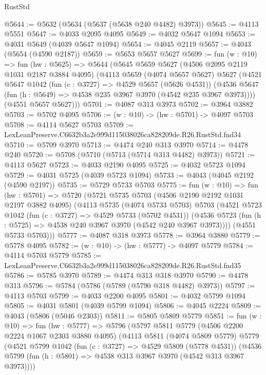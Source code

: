 \begin{lexlean}{RustStd}
\begin{coremodule}
@5644 := @5632 (@5634 (@5637 (@5638 @240 @4482) @3973))
@5645 := @4113 @5551
@5647 := @4033 @2095 @4095
@5649 := @4032 @5647 @1094
@5653 := @4031 @5649 (@4039 @5647 @1094)
@5654 := @4045 @2119
@5657 := @4043 (@5654 (@4590 @2187))
@5659 := @5653 @5657 @5627
@5699 := fun (w : @10) =>
  fun (hw : @5625) =>
  @5644
    (@5645
      @5659
      @5627
      (@4506 @2095 @2119 @1031 @2187 @3884 @4095)
      (@4113
        @5659
        (@4074 @5657 @5627)
        @5627
        (@4521
          @5647
          @1042
          (fun (c : @3727) => @4529 @5657 (@5626 @4531))
          (@4536 @5647 (fun (h : @5649) => @4538 @235 @3967 @3970 (@4542 @235 @3967 @3973))))
        (@4551 @5657 @5627)))
@5701 := @4087 @313 @3973
@5702 := @3964 @3882
@5703 := @5702 @4095
@5706 := (w : @10) -> (hw : @5701) -> @4097 @5703
@5708 := @4114 @5627 @5703
@5709 := LexLeanPreserve.C6632b3a2e999d115038026ca828209de.R26.RustStd.fnd34
@5710 := @5709 @3970
@5713 := @4474 @240 @313 @3970
@5714 := @4478 @240
@5720 := @5708 (@5710 (@5713 (@5714 @313 @4482) @3973))
@5721 := @4113 @5627
@5723 := @4033 @2190 @4095
@5725 := @4032 @5723 @1094
@5729 := @4031 @5725 (@4039 @5723 @1094)
@5733 := @4043 (@4045 @2192 (@4590 @2197))
@5735 := @5729 @5733 @5703
@5775 := fun (w : @10) =>
  fun (hw : @5701) =>
  @5720
    (@5721
      @5735
      @5703
      (@4506 @2190 @2192 @1031 @2197 @3882 @4095)
      (@4113
        @5735
        (@4074 @5733 @5703)
        @5703
        (@4521
          @5723
          @1042
          (fun (c : @3727) => @4529 @5733 (@5702 @4531))
          (@4536 @5723 (fun (h : @5725) => @4538 @240 @3967 @3970 (@4542 @240 @3967 @3973))))
        (@4551 @5733 @5703)))
@5777 := @4087 @318 @3973
@5778 := @3964 @3880
@5779 := @5778 @4095
@5782 := (w : @10) -> (hw : @5777) -> @4097 @5779
@5784 := @4114 @5703 @5779
@5785 := LexLeanPreserve.C6632b3a2e999d115038026ca828209de.R26.RustStd.fnd35
@5786 := @5785 @3970
@5789 := @4474 @313 @318 @3970
@5790 := @4478 @313
@5796 := @5784 (@5786 (@5789 (@5790 @318 @4482) @3973))
@5797 := @4113 @5703
@5799 := @4033 @2200 @4095
@5801 := @4032 @5799 @1094
@5805 := @4031 @5801 (@4039 @5799 @1094)
@5806 := @4045 @2224
@5809 := @4043 (@5806 (@5046 @2303))
@5811 := @5805 @5809 @5779
@5851 := fun (w : @10) =>
  fun (hw : @5777) =>
  @5796
    (@5797
      @5811
      @5779
      (@4506 @2200 @2224 @1067 @2303 @3880 @4095)
      (@4113
        @5811
        (@4074 @5809 @5779)
        @5779
        (@4521
          @5799
          @1042
          (fun (c : @3727) => @4529 @5809 (@5778 @4531))
          (@4536 @5799 (fun (h : @5801) => @4538 @313 @3967 @3970 (@4542 @313 @3967 @3973))))

\end{coremodule}
\end{lexlean}
